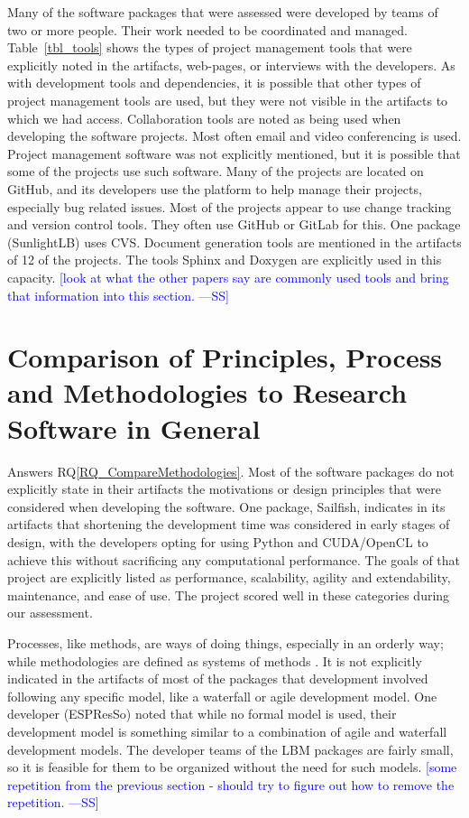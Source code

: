 \documentclass[final, 3p, times, authoryear]{elsarticle}
\newcommand{\authornote}[3]{\textcolor{#1}{[#3 ---#2]}}
\newcommand{\authornote}[3]{}
\newcommand{\wss}[1]{\authornote{blue}{SS}{#1}} %
\newcommand{\rqref}[1]{RQ\ref{#1}}
\begin{document}
Many of the software packages that were assessed were developed by teams of two
or more people. Their work needed to be coordinated and managed.
Table~\ref{tbl_tools} shows the types of project management tools that were
explicitly noted in the artifacts, web-pages, or interviews with the developers.
As with development tools and dependencies, it is possible that other types of
project management tools are used, but they were not visible in the artifacts to
which we had access.  Collaboration tools are noted as being used when
developing the software projects. Most often email and video conferencing is
used. Project management software was not explicitly mentioned, but it is
possible that some of the projects use such software. Many of the projects are
located on GitHub, and its developers use the platform to help manage their
projects, especially bug related issues. Most of the projects appear to use
change tracking and version control tools. They often use GitHub or GitLab for
this. One package (SunlightLB) uses CVS. Document generation tools are mentioned
in the artifacts of 12 of the projects. The tools Sphinx and Doxygen are
explicitly used in this capacity. \wss{look at what the other papers say are
commonly used tools and bring that information into this section.}

\section{Comparison of Principles, Process and Methodologies to Research Software in General} \label{Sec_CompareMethodologies}

Answers \rqref{RQ_CompareMethodologies}.  Most of the software packages do not
explicitly state in their artifacts the motivations or design principles that
were considered when developing the software. One package, Sailfish, indicates
in its artifacts that shortening the development time was considered in early
stages of design, with the developers opting for using Python and CUDA/OpenCL to
achieve this without sacrificing any computational performance. The goals of
that project are explicitly listed as performance, scalability, agility and
extendability, maintenance, and ease of use. The project scored well in these
categories during our assessment.

Processes, like methods, are ways of doing things, especially in an orderly way;
while methodologies are defined as systems of methods
\citep{ghezzi1991fundamentals}. It is not explicitly indicated in the artifacts
of most of the packages that development involved following any specific model,
like a waterfall or agile development model. One developer (ESPResSo) noted that
while no formal model is used, their development model is something similar to a
combination of agile and waterfall development models. The developer teams of
the LBM packages are fairly small, so it is feasible for them to be organized
without the need for such models.  \wss{some repetition from the previous
section - should try to figure out how to remove the repetition.}
\end{document}
